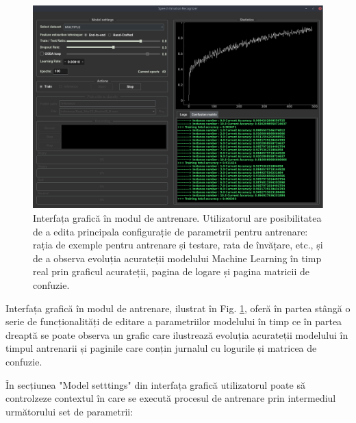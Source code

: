 \documentclass[a4paper,12pt]{book}
\begin{document}
		\begin{figure}[h]					
			\hspace{0cm}
			\includegraphics[scale=0.46]{gui_training4}
			\caption{Interfața grafică în modul de antrenare. Utilizatorul are posibilitatea de a edita principala configurație de parametrii pentru antrenare: rația de exemple pentru antrenare și testare, rata de învățare, etc., și de a observa evoluția acurateții modelului Machine Learning în timp real prin graficul acurateții, pagina de logare și pagina matricii de confuzie.}
			\label{fig:gui_train_1}
		\end{figure} 
		Interfața grafică în modul de antrenare, ilustrat în Fig. \ref{fig:gui_train_1}, oferă în partea stângă o serie de funcționalități de editare a parametriilor modelului în timp ce în partea dreaptă se poate observa un grafic care ilustrează evoluția acurateții modelului în timpul antrenarii și paginile care conțin jurnalul cu logurile și matricea de confuzie. \par 
		În secțiunea "Model setttings" din interfața grafică utilizatorul poate să controlzeze contextul în care se execută procesul de antrenare prin intermediul următorului set de parametrii:
\end{document}
